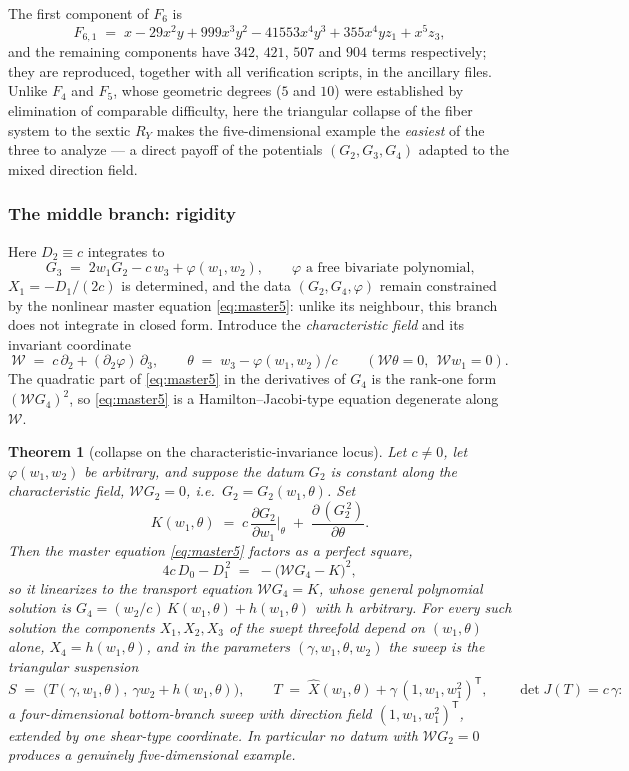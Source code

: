 \documentclass[11pt]{article}
\theoremstyle{plain}
\newtheorem{theorem}{Theorem}[section]
\theoremstyle{definition}
\theoremstyle{remark}
\begin{document}
The first component of $F_6$ is
\[
F_{6,1}\;=\;x-29x^2y+999x^3y^2-41553x^4y^3+355x^4yz_1+x^5z_3 ,
\]
and the remaining components have $342$, $421$, $507$ and $904$ terms
respectively; they are reproduced, together with all verification scripts, in
the ancillary files. Unlike $F_4$ and $F_5$, whose geometric degrees ($5$ and
$10$) were established by elimination of comparable difficulty, here the
triangular collapse of the fiber system to the sextic $R_Y$ makes the
five-dimensional example the \emph{easiest} of the three to analyze --- a
direct payoff of the potentials $(G_2,G_3,G_4)$ adapted to the mixed direction
field.

\subsubsection{The middle branch: rigidity}\label{subsubsec:middle5}

Here $D_2\equiv c$ integrates to
\[
G_3\;=\;2w_1G_2-c\,w_3+\varphi(w_1,w_2),
\qquad\text{$\varphi$ a free bivariate polynomial,}
\]
$X_1=-D_1/(2c)$ is determined, and the data $(G_2,G_4,\varphi)$ remain
constrained by the nonlinear master equation \eqref{eq:master5}: unlike its
neighbour, this branch does not integrate in closed form. Introduce the
\emph{characteristic field} and its invariant coordinate
\[
\mathcal W\;=\;c\,\partial_2+(\partial_2\varphi)\,\partial_3 ,
\qquad
\theta\;=\;w_3-\varphi(w_1,w_2)/c
\qquad(\mathcal W\theta=0,\ \ \mathcal W w_1=0).
\]
The quadratic part of \eqref{eq:master5} in the derivatives of $G_4$ is the
rank-one form $(\mathcal W G_4)^2$, so \eqref{eq:master5} is a
Hamilton--Jacobi-type equation degenerate along $\mathcal W$.

\begin{theorem}[collapse on the characteristic-invariance locus]\label{thm:collapse5}
Let $c\neq0$, let $\varphi(w_1,w_2)$ be arbitrary, and suppose the datum $G_2$ is
constant along the characteristic field, $\mathcal WG_2=0$, i.e.\
$G_2=G_2(w_1,\theta)$. Set
\[
K(w_1,\theta)\;=\;c\,\frac{\partial G_2}{\partial w_1}\Big|_{\theta}
\;+\;\frac{\partial\,(G_2^{\,2})}{\partial\theta}.
\]
Then the master equation \eqref{eq:master5} factors as a perfect square,
\[
4c\,D_0-D_1^{\,2}\;=\;-\bigl(\mathcal WG_4-K\bigr)^2 ,
\]
so it linearizes to the transport equation $\mathcal WG_4=K$, whose general
polynomial solution is $G_4=(w_2/c)\,K(w_1,\theta)+h(w_1,\theta)$ with $h$
arbitrary. For every such solution the components $X_1,X_2,X_3$ of the swept
threefold depend on $(w_1,\theta)$ alone, $X_4=h(w_1,\theta)$, and in the
parameters $(\gamma,w_1,\theta,w_2)$ the sweep is the triangular suspension
\[
S\;=\;\bigl(T(\gamma,w_1,\theta),\ \gamma w_2+h(w_1,\theta)\bigr),
\qquad
T\;=\;\widehat X(w_1,\theta)+\gamma\,(1,w_1,w_1^2)^{\mathsf T},
\qquad
\det J(T)=c\,\gamma:
\]
a four-dimensional bottom-branch sweep with direction field $(1,w_1,w_1^2)^{\mathsf T}$,
extended by one shear-type coordinate. In particular no datum with
$\mathcal WG_2=0$ produces a genuinely five-dimensional example.
\end{theorem}
\end{document}
